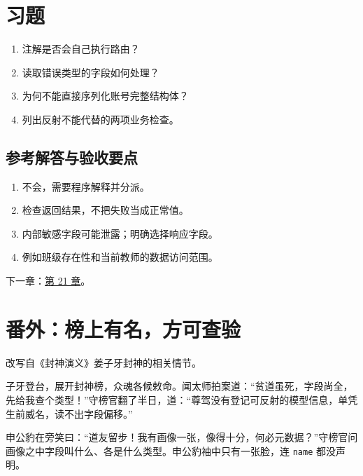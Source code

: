 \section{习题}

\begin{enumerate}

\item 注解是否会自己执行路由？

\item 读取错误类型的字段如何处理？

\item 为何不能直接序列化账号完整结构体？

\item 列出反射不能代替的两项业务检查。

\end{enumerate}

\subsection*{参考解答与验收要点}

\begin{enumerate}

\item 不会，需要程序解释并分派。

\item 检查返回结果，不把失败当成正常值。

\item 内部敏感字段可能泄露；明确选择响应字段。

\item 例如班级存在性和当前教师的数据访问范围。

\end{enumerate}

下一章：\hyperref[ch:21]{第 21 章}。

\section{番外：榜上有名，方可查验}

改写自《封神演义》姜子牙封神的相关情节。

子牙登台，展开封神榜，众魂各候敕命。闻太师拍案道：“贫道虽死，字段尚全，先给我查个类型！”守榜官翻了半日，道：“尊驾没有登记可反射的模型信息，单凭生前威名，读不出字段偏移。”

申公豹在旁笑曰：“道友留步！我有画像一张，像得十分，何必元数据？”守榜官问画像之中字段叫什么、各是什么类型。申公豹袖中只有一张脸，连 \texttt{name} 都没声明。

